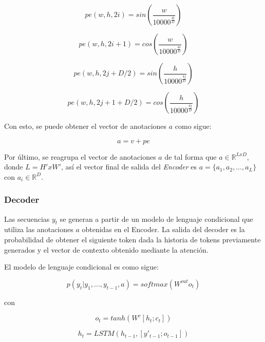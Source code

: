 \begin{equation}
    pe(w,h,2i) = sin\left(\frac{w}{10000 ^ {\frac{4i}{D}}}\right)
\end{equation}

\begin{equation}
    pe(w,h,2i+1) = cos\left(\frac{w}{10000 ^ {\frac{4i}{D}}}\right)
\end{equation}

\begin{equation}
    pe(w,h,2j+D/2) = sin\left(\frac{h}{10000 ^ {\frac{4j}{D}}}\right)
\end{equation}

\begin{equation}
    pe(w,h,2j+1+D/2) = cos\left(\frac{h}{10000 ^ {\frac{4j}{D}}}\right)
\end{equation}

Con esto, se puede obtener el vector de anotaciones $a$ como sigue:

\begin{equation}
    a = v + pe
\end{equation}

Por último, se reagrupa el vector de anotaciones $a$ de tal forma que $a \in \mathbb{R} ^ {LxD}$, donde $L = H' x W'$, así el vector final de salida del \textit{Encoder} es $a = \{ a_{1}, a_{2}, \dots , a_{L} \}$ con $a_{i} \in \mathbb{R} ^ {D}$.

\subsubsection{Decoder}

Las secuencias $y_{t}$ se generan a partir de un modelo de lenguaje condicional que utiliza las anotaciones $a$ obtenidas en el Encoder. La salida del decoder es la probabilidad de obtener el siguiente token dada la historia de tokens previamente generados y el vector de contexto obtenido mediante la atención.

El modelo de lenguaje condicional es como sigue:

\begin{equation}
    p(y_{t}|y_{1}, \dots , y_{t-1}, a) = softmax(W ^ {out}o_{t})
\end{equation}

con

\begin{equation}
    o_{t} = tanh(W ^ {c}[h_{t}; c_{t}])
\end{equation}

\begin{equation}
    h_{t} = LSTM(h_{t-1}, [y'_{t-1}; o_{t-1}])
\end{equation}

